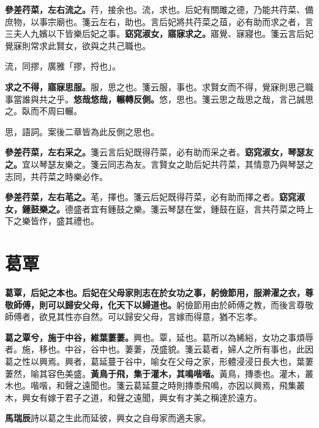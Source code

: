 \textbf{參差荇菜，左右流之。}{\footnotesize 荇，接余也。流，求也。后妃有關雎之德，乃能共荇菜、備庶物，以事宗廟也。箋云左右，助也。言后妃將共荇菜之葅，必有助而求之者，言三夫人九嬪以下皆樂后妃之事。}\textbf{窈窕淑女，寤寐求之。}{\footnotesize 寤覺、寐寢也。箋云言后妃覺寐則常求此賢女，欲與之共己職也。}

\begin{quoting}流，同摎，廣雅「摎，捋也」。\end{quoting}

\textbf{求之不得，寤寐思服。}{\footnotesize 服，思之也。箋云服，事也。求賢女而不得，覺寐則思己職事當誰與共之乎。}\textbf{悠哉悠哉，輾轉反側。}{\footnotesize 悠，思也。箋云思之哉思之哉，言己誠思之。臥而不周曰輾。}

\begin{quoting}思，語詞。案後二章皆為此反側之思也。\end{quoting}

\textbf{參差荇菜，左右采之。}{\footnotesize 箋云言后妃既得荇菜，必有助而采之者。}\textbf{窈窕淑女，琴瑟友之。}{\footnotesize 宜以琴瑟友樂之。箋云同志為友。言賢女之助后妃共荇菜，其情意乃與琴瑟之志同，共荇菜之時樂必作。}

\textbf{參差荇菜，左右芼之。}{\footnotesize 芼，擇也。箋云后妃既得荇菜，必有助而擇之者。}\textbf{窈窕淑女，鍾鼓樂之。}{\footnotesize 德盛者宜有鍾鼓之樂。箋云琴瑟在堂，鍾鼓在庭，言共荇菜之時上下之樂皆作，盛其禮也。}

\section{葛覃}


\textbf{葛覃，后妃之本也。后妃在父母家則志在於女功之事，躬儉節用，服澣濯之衣，尊敬師傅，則可以歸安父母，化天下以婦道也。}{\footnotesize 躬儉節用由於師傅之教，而後言尊敬師傅者，欲見其性亦自然。可以歸安父母，言嫁而得意，猶不忘孝。}

\textbf{葛之覃兮，施于中谷，維葉萋萋。}{\footnotesize 興也。覃，延也。葛所以為絺綌，女功之事煩辱者。施，移也。中谷，谷中也。萋萋，茂盛貌。箋云葛者，婦人之所有事也，此因葛之性以興焉。興者，葛延蔓于谷中，喻女在父母之家，形體浸浸日長大也，葉萋萋然，喻其容色美盛。}\textbf{黃鳥于飛，集于灌木，其鳴喈喈。}{\footnotesize 黃鳥，摶黍也。灌木，叢木也。喈喈，和聲之遠聞也。箋云葛延蔓之時則摶黍飛鳴，亦因以興焉，飛集叢木，興女有嫁于君子之道，和聲之遠聞，興女有才美之稱達於遠方。}

\begin{quoting}\textbf{馬瑞辰}詩以葛之生此而延彼，興女之自母家而適夫家。\end{quoting}

